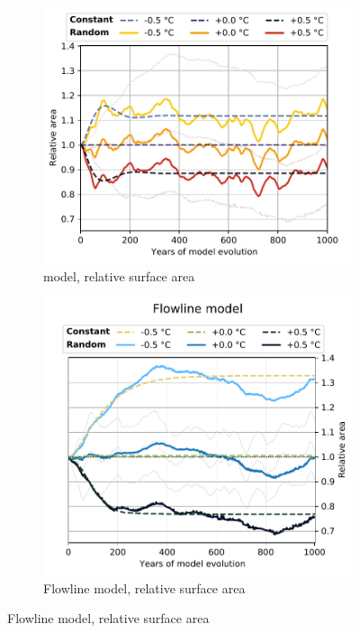 \begin{figure}[p]
          \begin{subfigure}[b]{0.476\textwidth}
            \caption{\Vas{} model, relative surface area}
            \label{fig:hintereisferner:area_vas}
            \centering
            \includegraphics[width=\textwidth]{../plots/final_plots/time_series/single_glaciers/area_norm_vas_Hintereisferner.pdf}
          \end{subfigure}
          \hfill
          \begin{subfigure}[b]{0.476\textwidth}
            \caption{Flowline model, relative surface area}
            \label{fig:hintereisferner:area_fl}
            \centering
            \includegraphics[width=\textwidth]{../plots/final_plots/time_series/single_glaciers/area_norm_fl_Hintereisferner.pdf}
          \end{subfigure}


\end{figure}

